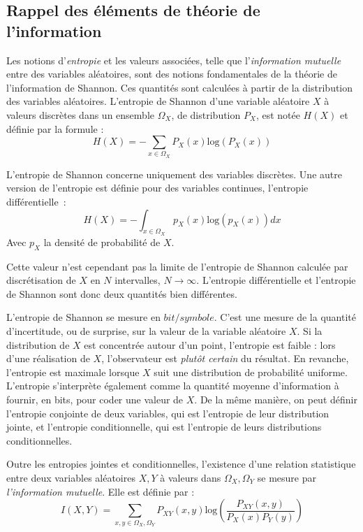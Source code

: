 \documentclass[../main]{subfiles}
\begin{document}
\subsection{Rappel des éléments de théorie de l'information}

Les notions d'\emph{entropie} et les valeurs associées, telle que l'\emph{information mutuelle} entre des variables aléatoires, sont des notions fondamentales de la théorie de l'information de Shannon. Ces quantités sont calculées à partir de la distribution des variables aléatoires.
L'entropie de Shannon d'une variable aléatoire $X$ à valeurs discrètes dans un ensemble $\Omega_X$, de distribution $P_X$, est notée $H(X)$ et définie par la formule : 
\begin{equation}
H(X) = - \sum_{x \in \Omega_X}{P_X(x)\textrm{log}(P_X(x))}
\end{equation}

L'entropie de Shannon concerne uniquement des variables discrètes.
Une autre version de l'entropie est définie pour des variables continues, l'entropie différentielle~:
\begin{equation}
    H(X) = - \int_{x \in \Omega_X}{p_X(x)\textrm{log}(p_X(x))dx}
\end{equation}
Avec $p_X$ la densité de probabilité de $X$.
    
Cette valeur n'est cependant pas la limite de l'entropie de Shannon calculée par discrétisation de $X$ en $N$ intervalles, $N \rightarrow \infty$.
L'entropie différentielle et l'entropie de Shannon sont donc deux quantités bien différentes.

L'entropie de Shannon se mesure en $bit/symbole$.
C'est une mesure de la quantité d'incertitude, ou de surprise, sur la valeur de la variable aléatoire $X$. Si la distribution de $X$ est concentrée autour d'un point, l'entropie est faible : lors d'une réalisation de $X$, l'observateur est \emph{plutôt certain} du résultat. En revanche, l'entropie est maximale lorsque $X$ suit une distribution de probabilité uniforme.
L'entropie s'interprète également comme la quantité moyenne d'information à fournir, en bits, pour coder une valeur de $X$.
De la même manière, on peut définir l'entropie conjointe de deux variables, qui est l'entropie de leur distribution jointe, et l'entropie conditionnelle, qui est l'entropie de leurs distributions conditionnelles.

Outre les entropies jointes et conditionnelles, l'existence d'une relation statistique entre deux variables aléatoires $X,Y$ à valeurs dans $\Omega_X,\Omega_Y$ se mesure par \emph{l'information mutuelle}.
Elle est définie par : 
\begin{equation}
 I(X,Y) = \sum_{x,y \in \Omega_X,\Omega_Y}{P_{XY}(x,y)\textrm{log}(\frac{P_{XY}(x,y)}{P_X(x)P_Y(y)})}
\end{equation}
\end{document}
